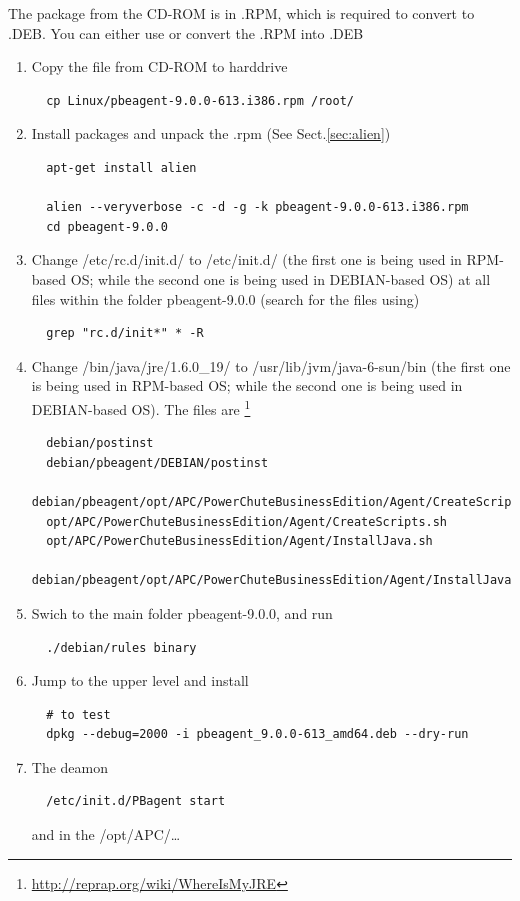 The package from the CD-ROM is in .RPM, which is required to convert to .DEB.
You can either use or convert the .RPM into .DEB 
\begin{enumerate}
  \item Copy the file from CD-ROM to harddrive
  \begin{verbatim}
  cp Linux/pbeagent-9.0.0-613.i386.rpm /root/
  \end{verbatim}
  
  \item Install packages and unpack the .rpm (See Sect.\ref{sec:alien})
  \begin{verbatim}
  apt-get install alien
  
  alien --veryverbose -c -d -g -k pbeagent-9.0.0-613.i386.rpm
  cd pbeagent-9.0.0
  \end{verbatim}
  
  \item Change /etc/rc.d/init.d/ to /etc/init.d/ (the first one is being used
  in RPM-based OS; while the second one is being used in DEBIAN-based OS)
  at all files within the folder pbeagent-9.0.0 (search for the files using)
  \begin{verbatim}
  grep "rc.d/init*" * -R
  \end{verbatim}
  
  \item Change /bin/java/jre/1.6.0\_19/ to /usr/lib/jvm/java-6-sun/bin (the
  first one is being used in RPM-based OS; while the second one is being used in DEBIAN-based OS). The
  files are \footnote{\url{http://reprap.org/wiki/WhereIsMyJRE}}
  
  \begin{verbatim}
  debian/postinst
  debian/pbeagent/DEBIAN/postinst
  debian/pbeagent/opt/APC/PowerChuteBusinessEdition/Agent/CreateScripts.sh
  opt/APC/PowerChuteBusinessEdition/Agent/CreateScripts.sh
  opt/APC/PowerChuteBusinessEdition/Agent/InstallJava.sh
  debian/pbeagent/opt/APC/PowerChuteBusinessEdition/Agent/InstallJava.sh
  \end{verbatim}
  
  \item Swich to the main folder pbeagent-9.0.0, and run
  \begin{verbatim}
  ./debian/rules binary
  \end{verbatim}
  
  \item Jump to the upper level and install 
  \begin{verbatim}
  # to test
  dpkg --debug=2000 -i pbeagent_9.0.0-613_amd64.deb --dry-run
  \end{verbatim}
  
  \item The deamon 
  \begin{verbatim}
  /etc/init.d/PBagent start
  \end{verbatim}
  and in the /opt/APC/\ldots
  
\end{enumerate}

